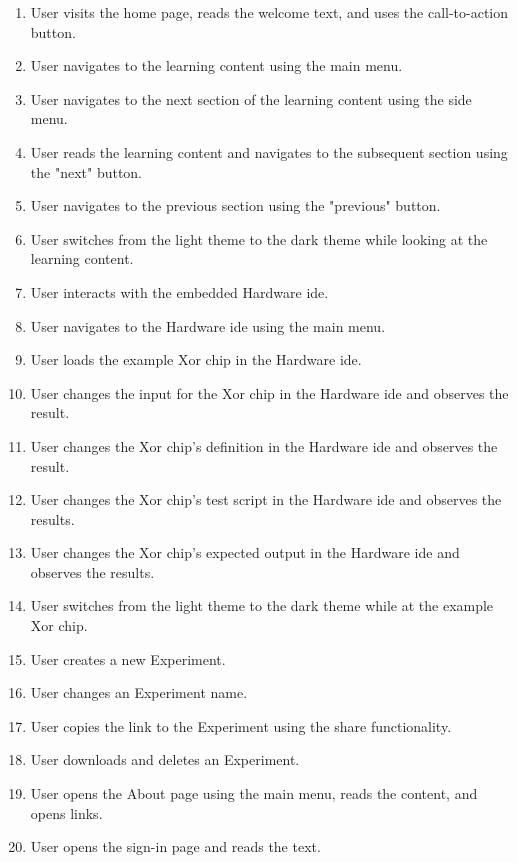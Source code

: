 \begin{enumerate}
    \item User visits the home page, reads the welcome text, and uses the call-to-action button.
    \item User navigates to the learning content using the main menu.
    \item User navigates to the next section of the learning content using the side menu.
    \item User reads the learning content and navigates to the subsequent section using the "next" button.
    \item User navigates to the previous section using the "previous" button.
    \item User switches from the light theme to the dark theme while looking at the learning content.
    \item User interacts with the embedded Hardware \gls{ide}.
    \item User navigates to the Hardware \gls{ide} using the main menu.
    \item User loads the example Xor chip in the Hardware \gls{ide}.
    \item User changes the input for the Xor chip in the Hardware \gls{ide} and observes the result.
    \item User changes the Xor chip's definition in the Hardware \gls{ide} and observes the result.
    \item User changes the Xor chip's test script in the Hardware \gls{ide} and observes the results.
    \item User changes the Xor chip's expected output in the Hardware \gls{ide} and observes the results.
    \item User switches from the light theme to the dark theme while at the example Xor chip.
    \item User creates a new Experiment.
    \item User changes an Experiment name.
    \item User copies the link to the Experiment using the share functionality.
    \item User downloads and deletes an Experiment.
    \item User opens the About page using the main menu, reads the content, and opens links.
    \item User opens the sign-in page and reads the text.
\end{enumerate}

